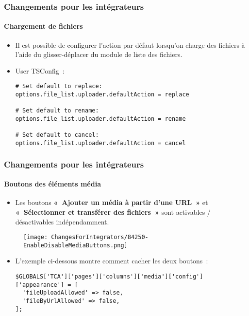 \begin{frame}[fragile]
	\frametitle{Changements pour les intégrateurs}
	\framesubtitle{Chargement de fichiers}

	\lstset{basicstyle=\smaller\ttfamily}

	\begin{itemize}
		\item Il est possible de configurer l'action par défaut lorsqu'on charge des fichiers
			à l'aide du glisser-déplacer du module de liste des fichiers.
		\item User TSConfig~:

\begin{lstlisting}
# Set default to replace:
options.file_list.uploader.defaultAction = replace

# Set default to rename:
options.file_list.uploader.defaultAction = rename

# Set default to cancel:
options.file_list.uploader.defaultAction = cancel
\end{lstlisting}

	\end{itemize}

\end{frame}


\begin{frame}[fragile]
	\frametitle{Changements pour les intégrateurs}
	\framesubtitle{Boutons des éléments média}

	\lstset{basicstyle=\tiny\ttfamily}

	\begin{itemize}
		\item Les boutons \textbf{«~Ajouter un média à partir d’une URL~»} et
			\textbf{«~Sélectionner et transférer des fichiers~»} sont activables
			/ désactivables indépendamment.
	\end{itemize}

	\begin{figure}
		\texttt{[image: ChangesForIntegrators/84250-EnableDisableMediaButtons.png]}
	\end{figure}

	\begin{itemize}
		\item L'exemple ci-dessous montre comment cacher les deux boutons~:

\begin{lstlisting}
$GLOBALS['TCA']['pages']['columns']['media']['config']['appearance'] = [
  'fileUploadAllowed' => false,
  'fileByUrlAllowed' => false,
];
\end{lstlisting}

	\end{itemize}

\end{frame}

